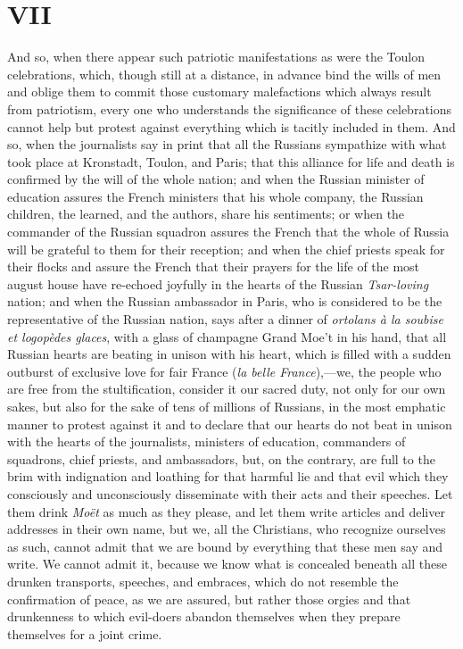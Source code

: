 \documentclass{book}
\begin{document}
\chapter{VII}
\label{chapter-7}
And so, when there appear such patriotic manifestations as were the Toulon celebrations, which, though still at a distance, in advance bind the wills of men and oblige them to commit those customary malefactions which always result from patriotism, every one who understands the significance of these celebrations cannot help but protest against everything which is tacitly included in them. And so, when the journalists say in print that all the Russians sympathize with what took place at Kronstadt, Toulon, and Paris; that this alliance for life and death is confirmed by the will of the whole nation; and when the Russian minister of education assures the French ministers that his whole company, the Russian children, the learned, and the authors, share his sentiments; or when the commander of the Russian squadron assures the French that the whole of Russia will be grateful to them for their reception; and when the chief priests speak for their flocks and assure the French that their prayers for the life of the most august house have re-echoed joyfully in the hearts of the Russian \emph{Tsar-loving} nation; and when the Russian ambassador in Paris, who is considered to be the representative of the Russian nation, says after a dinner of \emph{ortolans à la soubise et logopèdes glaces}, with a glass of champagne Grand Moe’t in his hand, that all Russian hearts are beating in unison with his heart, which is filled with a sudden outburst of exclusive love for fair France (\emph{la belle France}),—we, the people who are free from the stultification, consider it our sacred duty, not only for our own sakes, but also for the sake of tens of millions of Russians, in the most emphatic manner to protest against it and to declare that our hearts do not beat in unison with the hearts of the journalists, ministers of education, commanders of squadrons, chief priests, and ambassadors, but, on the contrary, are full to the brim with indignation and loathing for that harmful lie and that evil which they consciously and unconsciously disseminate with their acts and their speeches. Let them drink \emph{Moët} as much as they please, and let them write articles and deliver addresses in their own name, but we, all the Christians, who recognize ourselves as such, cannot admit that we are bound by everything that these men say and write. We cannot admit it, because we know what is concealed beneath all these drunken transports, speeches, and embraces, which do not resemble the confirmation of peace, as we are assured, but rather those orgies and that drunkenness to which evil-doers abandon themselves when they prepare themselves for a joint crime.
\end{document}

